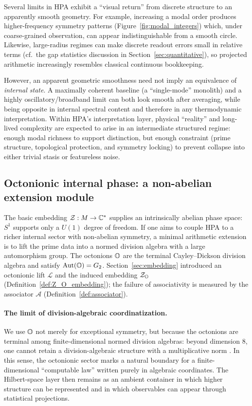\begin{remark}
\label{rem:asymptotic_return_smoothness}
Several limits in HPA exhibit a ``visual return'' from discrete structure to an apparently smooth geometry.
For example, increasing a modal order produces higher-frequency symmetry patterns (Figure~\ref{fig:modal_integers}) which, under coarse-grained observation, can appear indistinguishable from a smooth circle.
Likewise, large-radius regimes can make discrete readout errors small in relative terms (cf.\ the gap statistics discussion in Section~\ref{sec:quantitative}), so projected arithmetic increasingly resembles classical continuous bookkeeping.

However, an apparent geometric smoothness need not imply an equivalence of \emph{internal state}.
A maximally coherent baseline (a ``single-mode'' monolith) and a highly oscillatory/broadband limit can both look smooth after averaging, while being opposite in internal spectral content and therefore in any thermodynamic interpretation.
Within HPA's interpretation layer, physical ``reality'' and long-lived complexity are expected to arise in an intermediate structured regime: enough modal richness to support distinction, but enough constraint (prime structure, topological protection, and symmetry locking) to prevent collapse into either trivial stasis or featureless noise.
\end{remark}

\subsection{Octonionic internal phase: a non-abelian extension module}
The basic embedding $\mathcal{Z}:M\to\mathbb{C}^*$ supplies an intrinsically abelian phase space: $S^1$ supports only a $U(1)$ degree of freedom.
If one aims to couple HPA to a richer internal sector with non-abelian symmetry, a minimal arithmetic extension is to lift the prime data into a normed division algebra with a large automorphism group.
The octonions $\mathbb{O}$ are the terminal Cayley--Dickson division algebra and satisfy $\mathrm{Aut}(\mathbb{O})=G_2$.
Section~\ref{sec:embedding} introduced an octonionic lift $\mathcal{L}$ and the induced embedding $\mathcal{Z}_{\mathbb{O}}$ (Definition~\ref{def:Z_O_embedding}); the failure of associativity is measured by the associator $\mathcal{A}$ (Definition~\ref{def:associator}).

\paragraph{The limit of division-algebraic coordinatization.}
We use $\mathbb{O}$ not merely for exceptional symmetry, but because the octonions are terminal among finite-dimensional normed division algebras: beyond dimension $8$, one cannot retain a division-algebraic structure with a multiplicative norm \cite{Baez2002}. In this sense, the octonionic sector marks a natural boundary for a finite-dimensional ``computable law'' written purely in algebraic coordinates. The Hilbert-space layer then remains as an ambient container in which higher structure can be represented and in which observables can appear through statistical projections.

